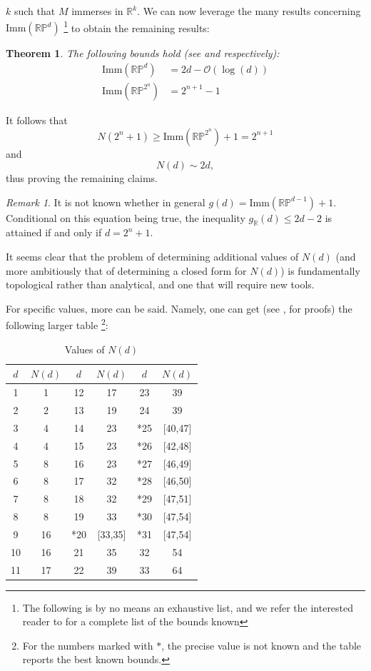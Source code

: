 \documentclass[11pt, a4paper, reqno]{elsarticle}
\newtheorem{theorem}{Theorem}[section]
\theoremstyle{definition}
\theoremstyle{remark}
\newtheorem{remark}{Remark}
\begin{document}
$k$ such that $M$ immerses in $\mathbb{R}^k$. 
We can now leverage the many results
concerning $\mathrm{Imm}(\mathbb{R}\mathbb P^d)$ \footnote{The following is by no means an exhaustive list, and we refer
the interested reader to \cite{davis_immtable} for a complete list of the bounds known} to obtain the remaining results:
\begin{theorem}\label{thm : algtop}The following bounds hold (see \cite[Theorem 1.4]{AsteyDavis1980} and \cite[Theorem 4.8]{Milnor} respectively): 
        \begin{align*}
        \mathrm{Imm}(\mathbb{R}\mathbb P^d)&=2d-\mathcal O(\log(d))\\
\mathrm{Imm}(\mathbb{R}\mathbb P^{2^n})&= 2^{n+1}-1
        \end{align*}
        \end{theorem}
It follows that
\begin{equation*}
    N(2^n+1)\ge \mathrm{Imm}(\mathbb{R}\mathbb P^{2^n})+1=2^{n+1}
\end{equation*}
and 
\begin{equation*}
    N(d)\sim 2d,
\end{equation*}
thus proving the remaining claims.
\begin{remark}
It is not known whether in general
$g(d)=\mathrm{Imm}(\mathbb{R}\mathbb P^{d-1})+1$.
Conditional on this equation being
true, the inequality $g_\mathbb{R}(d)\le 2d-2$
is attained if and only if $d=2^n+1$.\par
It seems clear that the problem of
determining additional values of $N(d)$
(and more ambitiously that of
determining a closed form for $N(d)$)
is fundamentally topological rather than analytical,
and one that will require new tools.
\end{remark}
For specific values, more can be said. Namely,  one can get
(see \cite{Adem}, \cite{DominguezLam2021} for proofs) the 
following larger table
\footnote{
For the numbers marked with $*$, 
the precise value is not known
and the table reports the best known bounds.
}:
\begin{table}[ht]
\centering
\caption{Values of $N(d)$}
\begin{tabular}{|cc|cc|cc|}
\hline
\hline
$d$ & $N(d)$ & $d$ & $N(d)$ & $d$ & $N(d)$ \\
\hline
1 & 1 & 12 & 17 & 23 & 39 \\
2 & 2 & 13 & 19 & 24 & 39 \\
3 & 4 & 14 & 23 & *25 & [40,47] \\
4 & 4 & 15 & 23 & *26 & [42,48] \\
5 & 8 & 16 & 23 & *27 & [46,49] \\
6 & 8 & 17 & 32 & *28 & [46,50] \\
7 & 8 & 18 & 32 & *29 & [47,51] \\
8 & 8 & 19 & 33 & *30 & [47,54] \\
9 & 16 & *20 & [33,35] & *31 & [47,54] \\
10 & 16 & 21 & 35 & 32 & 54 \\
11 & 17 & 22 & 39 & 33   & 64   \\
\hline
\end{tabular}
\end{table}
\end{document}

